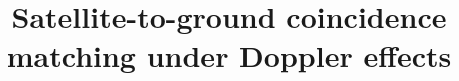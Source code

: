 \documentclass{article}
\begin{document}
\title{\vspace{-2.0cm} Satellite-to-ground coincidence matching under Doppler effects}
\maketitle







\end{document}
